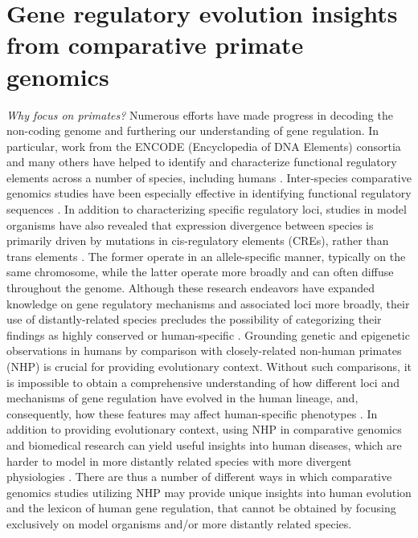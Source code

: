 \section{Gene regulatory evolution insights from comparative primate genomics}

\textit{Why focus on primates?} Numerous efforts have made progress in decoding the non-coding genome and furthering our understanding of gene regulation. In particular, work from the ENCODE (Encyclopedia of DNA Elements) consortia and many others have helped to identify and characterize functional regulatory elements across a number of species, including humans \cite{Bernstein.2010, Consortium.2012, Consortium.2012ec, Celniker.2009}. Inter-species comparative genomics studies have been especially effective in identifying functional regulatory sequences \cite{Nobrega.2004}. In addition to characterizing specific regulatory loci, studies in model organisms have also revealed that expression divergence between species is primarily driven by mutations in cis-regulatory elements (CREs), rather than trans elements \cite{Tirosh.2011}. The former operate in an allele-specific manner, typically on the same chromosome, while the latter operate more broadly and can often diffuse throughout the genome. Although these research endeavors have expanded knowledge on gene regulatory mechanisms and associated loci more broadly, their use of distantly-related species precludes the possibility of categorizing their findings as highly conserved or human-specific \cite{Housman.2020}. Grounding genetic and epigenetic observations in humans by comparison with closely-related non-human primates (NHP) is crucial for providing evolutionary context. Without such comparisons, it is impossible to obtain a comprehensive understanding of how different loci and mechanisms of gene regulation have evolved in the human lineage, and, consequently, how these features may affect human-specific phenotypes \cite{Romero.2012}. In addition to providing evolutionary context, using NHP in comparative genomics and biomedical research can yield useful insights into human diseases, which are harder to model in more distantly related species with more divergent physiologies \cite{Rogers.2014}. There are thus a number of different ways in which comparative genomics studies utilizing NHP may provide unique insights into human evolution and the lexicon of human gene regulation, that cannot be obtained by focusing exclusively on model organisms and/or more distantly related species.

